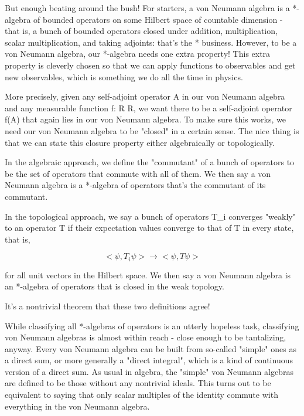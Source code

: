 But enough beating around the bush!  For starters, a von Neumann algebra
is a *-algebra of bounded operators on some Hilbert space of countable
dimension - that is, a bunch of bounded operators closed under addition,
multiplication, scalar multiplication, and taking adjoints: that's the *
business.  However, to be a von Neumann algebra, our *-algebra needs one
extra property!  This extra property is cleverly chosen so that we can
apply functions to observables and get new observables, which is
something we do all the time in physics.  

More precisely, given any self-adjoint operator A in our von Neumann
algebra and any measurable function f: R \to  R, we want there to be a
self-adjoint operator f(A) that again lies in our von Neumann algebra.
To make sure this works, we need our von Neumann algebra to be "closed"
in a certain sense.   The nice thing is that we can state this closure
property either algebraically or topologically.  

In the algebraic approach, we define the "commutant" of a bunch of
operators to be the set of operators that commute with all of them.  
We then say a von Neumann algebra is a *-algebra of operators that's 
the commutant of its commutant.  

In the topological approach, we say a bunch of operators T_{i}
converges "weakly" to an operator T if their expectation
values converge to that of T in every state, that is,


$$

<\psi , T_{i} \psi >  \to   <\psi , T \psi >
$$
    
for all unit vectors \psi  in the Hilbert space.  We then say a von 
Neumann algebra is an *-algebra of operators that is closed in the 
weak topology.  

It's a nontrivial theorem that these two definitions agree!

While classifying all *-algebras of operators is an utterly hopeless
task, classifying von Neumann algebras is almost within reach - close
enough to be tantalizing, anyway.  Every von Neumann algebra can be
built from so-called "simple" ones as a direct sum, or more generally a
"direct integral", which is a kind of continuous version of a direct
sum.  As usual in algebra, the "simple" von Neumann algebras are defined
to be those without any nontrivial ideals.  This turns out to be
equivalent to saying that only scalar multiples of the identity commute
with everything in the von Neumann algebra.   

